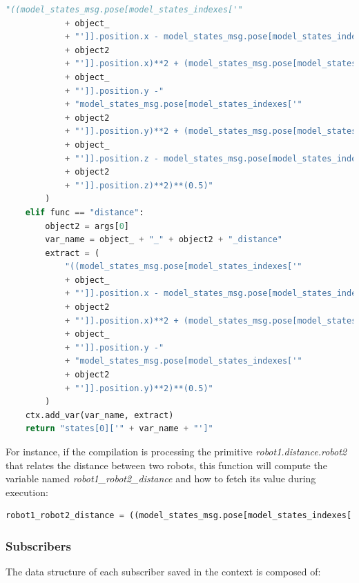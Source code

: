 \begin{lstlisting}[language=Python]
            "((model_states_msg.pose[model_states_indexes['"
            + object_
            + "']].position.x - model_states_msg.pose[model_states_indexes['"
            + object2
            + "']].position.x)**2 + (model_states_msg.pose[model_states_indexes['"
            + object_
            + "']].position.y -"
            + "model_states_msg.pose[model_states_indexes['"
            + object2
            + "']].position.y)**2 + (model_states_msg.pose[model_states_indexes['"
            + object_
            + "']].position.z - model_states_msg.pose[model_states_indexes['"
            + object2
            + "']].position.z)**2)**(0.5)"
        )
    elif func == "distance":
        object2 = args[0]
        var_name = object_ + "_" + object2 + "_distance"
        extract = (
            "((model_states_msg.pose[model_states_indexes['"
            + object_
            + "']].position.x - model_states_msg.pose[model_states_indexes['"
            + object2
            + "']].position.x)**2 + (model_states_msg.pose[model_states_indexes['"
            + object_
            + "']].position.y -"
            + "model_states_msg.pose[model_states_indexes['"
            + object2
            + "']].position.y)**2)**(0.5)"
        )
    ctx.add_var(var_name, extract)
    return "states[0]['" + var_name + "']"
\end{lstlisting}

For instance, if the compilation is processing the primitive \textit{robot1.distance.robot2} that relates the distance between two robots, this function will compute the variable named \textit{robot1\_robot2\_distance} and how to fetch its value during execution:
\begin{lstlisting}[language=Python]
robot1_robot2_distance = ((model_states_msg.pose[model_states_indexes[’robot1’]].position.x - model_states_msg.pose[model_states_indexes[’robot2’]].position.x)**2 +(model_states_msg.pose[model_states_indexes[’robot1’]].position.y - model_states_msg.pose[model_states_indexes[’robot2’]].position.y)**2)**(0.5)
\end{lstlisting}

\subsubsection{Subscribers}
\label{sssec:compileSubs}

The data structure of each subscriber saved in the context is composed of:

